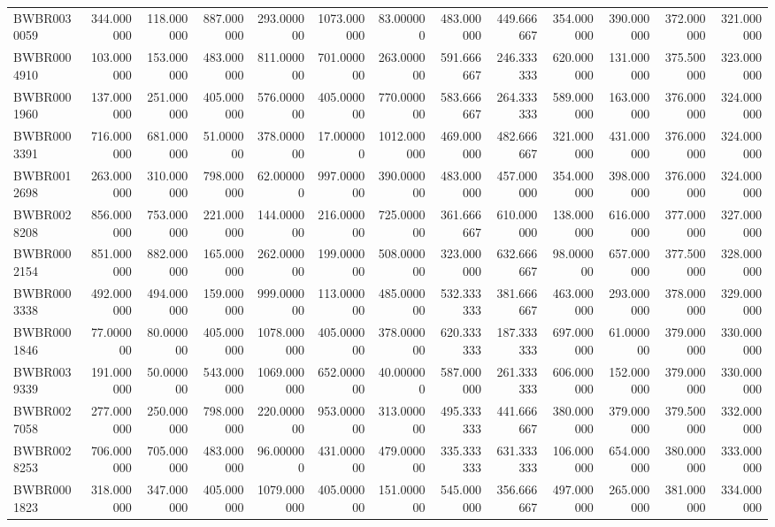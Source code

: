 \begin{longtable}{lrrrrrrrrrrrr}
BWBR0030059 & 344.000000 & 118.000000 & 887.000000 & 293.000000 & 1073.000000 & 83.000000 & 483.000000 & 449.666667 & 354.000000 & 390.000000 & 372.000000 & 321.000000 \\
BWBR0004910 & 103.000000 & 153.000000 & 483.000000 & 811.000000 & 701.000000 & 263.000000 & 591.666667 & 246.333333 & 620.000000 & 131.000000 & 375.500000 & 323.000000 \\
BWBR0001960 & 137.000000 & 251.000000 & 405.000000 & 576.000000 & 405.000000 & 770.000000 & 583.666667 & 264.333333 & 589.000000 & 163.000000 & 376.000000 & 324.000000 \\
BWBR0003391 & 716.000000 & 681.000000 & 51.000000 & 378.000000 & 17.000000 & 1012.000000 & 469.000000 & 482.666667 & 321.000000 & 431.000000 & 376.000000 & 324.000000 \\
BWBR0012698 & 263.000000 & 310.000000 & 798.000000 & 62.000000 & 997.000000 & 390.000000 & 483.000000 & 457.000000 & 354.000000 & 398.000000 & 376.000000 & 324.000000 \\
BWBR0028208 & 856.000000 & 753.000000 & 221.000000 & 144.000000 & 216.000000 & 725.000000 & 361.666667 & 610.000000 & 138.000000 & 616.000000 & 377.000000 & 327.000000 \\
BWBR0002154 & 851.000000 & 882.000000 & 165.000000 & 262.000000 & 199.000000 & 508.000000 & 323.000000 & 632.666667 & 98.000000 & 657.000000 & 377.500000 & 328.000000 \\
BWBR0003338 & 492.000000 & 494.000000 & 159.000000 & 999.000000 & 113.000000 & 485.000000 & 532.333333 & 381.666667 & 463.000000 & 293.000000 & 378.000000 & 329.000000 \\
BWBR0001846 & 77.000000 & 80.000000 & 405.000000 & 1078.000000 & 405.000000 & 378.000000 & 620.333333 & 187.333333 & 697.000000 & 61.000000 & 379.000000 & 330.000000 \\
BWBR0039339 & 191.000000 & 50.000000 & 543.000000 & 1069.000000 & 652.000000 & 40.000000 & 587.000000 & 261.333333 & 606.000000 & 152.000000 & 379.000000 & 330.000000 \\
BWBR0027058 & 277.000000 & 250.000000 & 798.000000 & 220.000000 & 953.000000 & 313.000000 & 495.333333 & 441.666667 & 380.000000 & 379.000000 & 379.500000 & 332.000000 \\
BWBR0028253 & 706.000000 & 705.000000 & 483.000000 & 96.000000 & 431.000000 & 479.000000 & 335.333333 & 631.333333 & 106.000000 & 654.000000 & 380.000000 & 333.000000 \\
BWBR0001823 & 318.000000 & 347.000000 & 405.000000 & 1079.000000 & 405.000000 & 151.000000 & 545.000000 & 356.666667 & 497.000000 & 265.000000 & 381.000000 & 334.000000 \\

\end{longtable}
